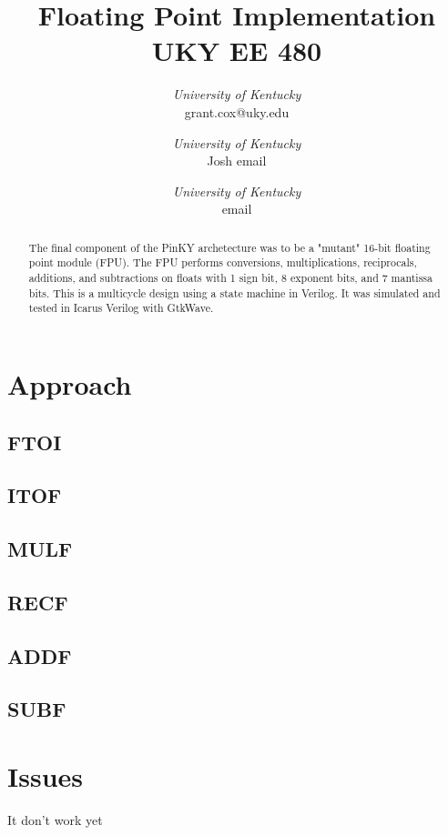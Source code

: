 \documentclass[conference]{IEEEtran}
\begin{document}
\title{Floating Point Implementation\\
    UKY EE 480}

\author{
\textit{University of Kentucky}\\
grant.cox@uky.edu
\and
{}
\textit{University of Kentucky}\\
Josh email
\and
{}
\textit{University of Kentucky}\\
email}

\maketitle




\begin{abstract}
    The final component of the PinKY archetecture was to be a "mutant" 16-bit floating point module (FPU). The FPU performs conversions, multiplications, reciprocals, additions, and subtractions on floats with 1 sign bit, 8 exponent bits, and 7 mantissa bits. This is a multicycle design using a state machine in Verilog. It was simulated and tested in Icarus Verilog with GtkWave.
\end{abstract}

\section{Approach}
    \subsection{FTOI}
    \subsection{ITOF}
    \subsection{MULF}
    \subsection{RECF}
    \subsection{ADDF}
    \subsection{SUBF}

\section{Issues}
    It don't work yet
\end{document}

